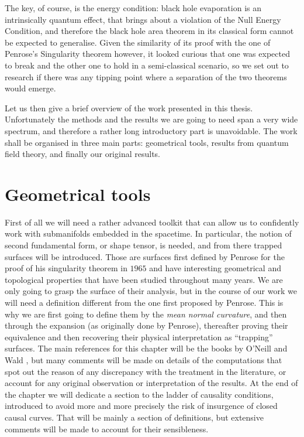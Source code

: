The key, of course, is the energy condition: black hole evaporation is an intrinsically quantum effect, that brings about a violation of the Null Energy Condition, and therefore the black hole area theorem in its classical form cannot be expected to generalise. Given the similarity of its proof with the one of Penrose's Singularity theorem however, it looked curious that one was expected to break and the other one to hold in a semi-classical scenario, so we set out to research if there was any tipping point where a separation of the two theorems would emerge.

Let us then give a brief overview of the work presented in this thesis. Unfortunately the methods and the results we are going to need span a very wide spectrum, and therefore a rather long introductory part is unavoidable. The work shall be organised in three main parts: geometrical tools, results from quantum field theory, and finally our original results.

\section{Geometrical tools}
First of all we will need a rather advanced toolkit that can allow us to confidently work with submanifolds embedded in the spacetime. In particular, the notion of second fundamental form, or shape tensor, is needed, and from there trapped surfaces will be introduced. Those are surfaces first defined by Penrose for the proof of his singularity theorem in \(1965\) and have interesting geometrical and topological properties that have been studied throughout many years. We are only going to grasp the surface of their analysis, but in the course of our work we will need a definition different from the one first proposed by Penrose. This is why we are first going to define them by the \emph{mean normal curvature}, and then through the expansion (as originally done by Penrose), thereafter proving their equivalence and then recovering their physical interpretation as ``trapping'' surfaces.
The main references for this chapter will be the books by O'Neill \cite[]{o1983semi} and Wald \cite[]{wald2010general}, but many comments will be made on details of the computations that spot out the reason of any discrepancy with the treatment in the literature, or account for any original observation or interpretation of the results.
At the end of the chapter we will dedicate a section to the ladder of causality conditions, introduced to avoid more and more precisely the risk of insurgence of closed causal curves. That will be mainly a section of definitions, but extensive comments will be made to account for their sensibleness.  

